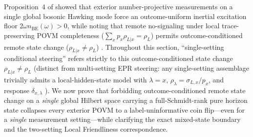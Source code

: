 \documentclass[11pt,a4paper]{article}
\theoremstyle{definition}
\theoremstyle{remark}
\newcommand{\1}{\mathbf{1}}
\begin{document}
Proposition~4 of \cite{Soga2026OSTQDSK} showed that exterior number-projective measurements on a single global bosonic Hawking mode force an outcome-uniform inertial excitation floor $2\omega n_{\mathrm{BE}}(\omega)>0$, while noting that remote no-signaling under local trace-preserving POVM completeness ($\sum_x p_x\rho_{L|x}=\rho_L$) permits outcome-conditioned remote state change ($\rho_{L|x}\neq\rho_L$) \cite{HJW1993,WisemanJonesDoherty2007}. Throughout this section, ``single-setting conditional steering'' refers strictly to this outcome-conditioned state change $\rho_{L|x}\neq\rho_L$ (distinct from multi-setting EPR steering: any single-setting assemblage trivially admits a local-hidden-state model with $\lambda=x$, $\rho_\lambda=\sigma_{L,x}/p_x$, and response $\delta_{x,\lambda}$ \cite{WisemanJonesDoherty2007}). We now prove that forbidding outcome-conditioned remote state change on a \emph{single} global Hilbert space carrying a full-Schmidt-rank pure horizon state collapses every exterior POVM to a label-uninformative coin flip---even for a \emph{single} measurement setting---while clarifying the exact mixed-state boundary and the two-setting Local Friendliness correspondence.
\end{document}
